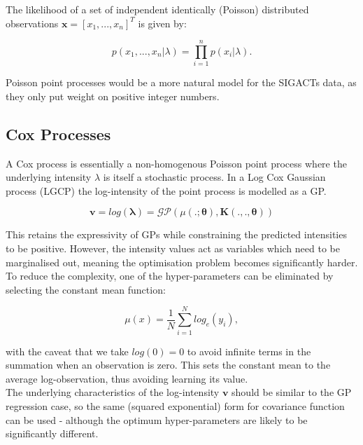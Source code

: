 \documentclass[a4paper,11pt]{report}
\begin{document}
The likelihood of a set of independent identically (Poisson) distributed observations \(\mathbf{x}=[x_1,...,x_n]^T\) is given by:

\begin{equation}
p(x_1,...,x_n|\lambda) = \prod_{i=1}^{n} p(x_i|\lambda).
\end{equation}

Poisson point processes would be a more natural model for the SIGACTs data, as they only put weight on positive integer numbers. 


\subsection{Cox Processes}
A Cox process is essentially a non-homogenous Poisson point process where the underlying intensity \(\lambda\) is itself a stochastic process. In a Log Cox Gaussian process (LGCP) the log-intensity of the point process is modelled as a GP. \cite{LGCP-moller}

\begin{equation} \label{eq:LGCPsetup}
\mathbf{v} = log(\boldsymbol{\lambda}) = \mathcal{G}\mathcal{P} ( \mu(. ;\boldsymbol{\theta}) , \mathbf{K}(. , . ,\boldsymbol{\theta}))
\end{equation}

This retains the expressivity of GPs while constraining the predicted intensities to be positive. However, the intensity values act as variables which need to be marginalised out, meaning the optimisation problem becomes significantly harder. To reduce the complexity, one of the hyper-parameters can be eliminated by selecting the constant mean function:

\begin{equation} \label{eq:LGCPmean}
\mu (x) = \frac{1}{N} \sum_{i=1}^{N} log_e(y_i),
\end{equation}

with the caveat that we take \(log(0)=0\) to avoid infinite terms in the summation when an observation is zero. This sets the constant mean to the average log-observation, thus avoiding learning its value. \\

The underlying characteristics of the log-intensity \(\mathbf{v}\) should be similar to the GP regression case, so the same (squared exponential) form for covariance function can be used - although the optimum hyper-parameters are likely to be significantly different.
\end{document}
